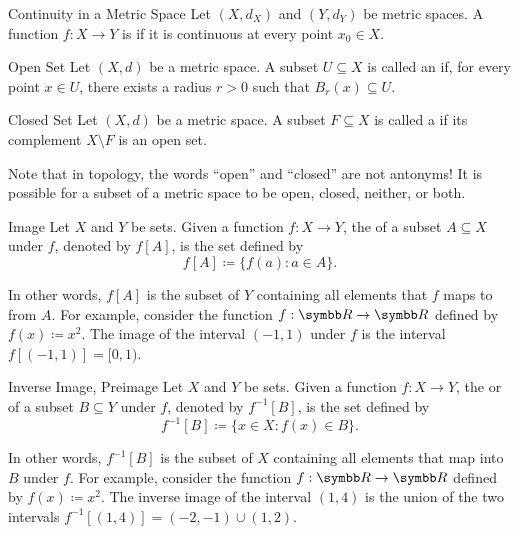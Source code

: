 \documentclass[12pt]{article}
\begin{document}
\begin{dfnbox}{Continuity in a Metric Space}
	Let $(X, d_X)$ and $(Y, d_Y)$ be metric spaces. A function $f: X \to Y$ is  if it is continuous at every point $x_0 \in X$.
\end{dfnbox}

\begin{dfnbox}{Open Set}
	Let $(X, d)$ be a metric space. A subset $U \subseteq X$ is called an  if, for every point $x \in U$, there exists a radius $r > 0$ such that $B_r(x) \subseteq U$.
\end{dfnbox}

\begin{dfnbox}{Closed Set}
	Let $(X, d)$ be a metric space. A subset $F \subseteq X$ is called a  if its complement $X \setminus F$ is an open set.
\end{dfnbox}

Note that in topology, the words ``open'' and ``closed'' are not antonyms! It is possible for a subset of a metric space to be open, closed, neither, or both.

\begin{dfnbox}{Image}
	Let $X$ and $Y$ be sets. Given a function $f: X \to Y$, the  of a subset $A \subseteq X$ under $f$, denoted by $f[A]$, is the set defined by
	\[ f[A] \coloneq \{ f(a) : a \in A \}. \]
\end{dfnbox}

In other words, $f[A]$ is the subset of $Y$ containing all elements that $f$ maps to from $A$. For example, consider the function $f: \R \to \R$ defined by $f(x) \coloneq x^2$. The image of the interval $(-1, 1)$ under $f$ is the interval $f[(-1, 1)] = [0, 1)$.

\begin{dfnbox}{Inverse Image, Preimage}
	Let $X$ and $Y$ be sets. Given a function $f: X \to Y$, the  or  of a subset $B \subseteq Y$ under $f$, denoted by $f^{-1}[B]$, is the set defined by
	\[ f^{-1}[B] \coloneq \{ x \in X : f(x) \in B \}. \]
\end{dfnbox}

In other words, $f^{-1}[B]$ is the subset of $X$ containing all elements that map into $B$ under $f$. For example, consider the function $f: \R \to \R$ defined by $f(x) \coloneq x^2$. The inverse image of the interval $(1, 4)$ is the union of the two intervals $f^{-1}[(1, 4)] = (-2, -1) \cup (1, 2)$.
\end{document}
